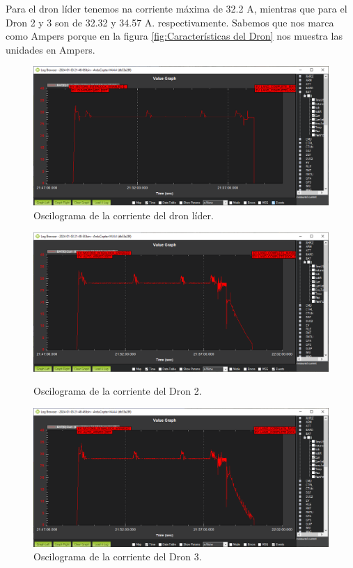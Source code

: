 Para el dron líder tenemos na corriente máxima de 32.2 A, mientras que para el Dron 2 y 3 son de 32.32 y 34.57 A. respectivamente. Sabemos que nos marca como Ampers porque en la figura \ref{fig:Características del Dron} nos muestra las unidades en Ampers.
\begin{figure}[h]

\centering
    \includegraphics[width=\linewidth]{imagenes/dron_lider.png}
    \caption{Oscilograma de la corriente del dron líder.}
    \label{fig:subfig1}
\end{figure}

\newpage

\begin{figure}[h!]
    \includegraphics[width=\linewidth]{imagenes/dron_2.png}
    \caption{Oscilograma de la corriente del Dron 2.}
    \label{fig:subfig2}

    \vspace{1em} %

    \centering
    \includegraphics[width=\linewidth]{imagenes/dron_3.png}
    \caption{Oscilograma de la corriente del Dron 3.}
    \label{fig:enter-label}
\end{figure}

